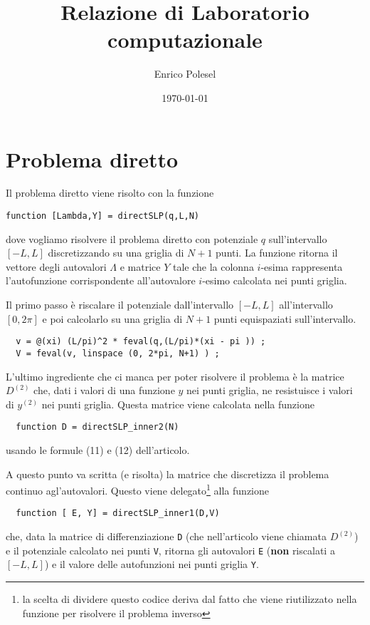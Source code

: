 \documentclass[a4paper,10pt]{article}
\title{Relazione di Laboratorio computazionale}
\author{Enrico Polesel}
\date{\today}
\theoremstyle{plain}
\theoremstyle{definition}
\theoremstyle{remark}
\begin{document}
\maketitle

\lstset{language=Matlab,frame=single}

\section{Problema diretto}

Il problema diretto viene risolto con la funzione
\begin{lstlisting}
function [Lambda,Y] = directSLP(q,L,N)
\end{lstlisting}
dove vogliamo risolvere il problema diretto con potenziale $q$
sull'intervallo $[-L,L]$ discretizzando su una griglia di $N+1$
punti. La funzione ritorna il vettore degli autovalori $\Lambda$ e
matrice $Y$ tale che la colonna $i$-esima rappresenta l'autofunzione
corrispondente all'autovalore $i$-esimo calcolata nei punti griglia. 

Il primo passo è riscalare il potenziale dall'intervallo $[-L,L]$
all'intervallo $[0,2\pi ]$ e poi calcolarlo su una griglia di $N+1$
punti equispaziati sull'intervallo.
\begin{lstlisting}
  v = @(xi) (L/pi)^2 * feval(q,(L/pi)*(xi - pi )) ;
  V = feval(v, linspace (0, 2*pi, N+1) ) ;
\end{lstlisting}

L'ultimo ingrediente che ci manca per poter risolvere il problema è la
matrice $D^{(2)}$ che, dati i valori di una funzione $y$ nei punti
griglia, ne resistuisce i valori di $y^{(2)}$ nei punti
griglia. Questa matrice viene calcolata nella funzione
\begin{lstlisting}
  function D = directSLP_inner2(N)
\end{lstlisting}
usando le formule (11) e (12) dell'articolo.

A questo punto va scritta (e risolta) la matrice che discretizza il
problema continuo agl'autovalori. Questo viene delegato\footnote{la
  scelta di dividere questo codice deriva dal fatto che viene
  riutilizzato nella funzione per risolvere il problema inverso} alla
funzione
\begin{lstlisting}
  function [ E, Y] = directSLP_inner1(D,V)
\end{lstlisting}
che, data la matrice di differenziazione \lstinline{D} (che
nell'articolo viene chiamata $D^{(2)}$) e il potenziale calcolato nei
punti \lstinline{V}, ritorna gli autovalori \lstinline{E} (\textbf{non}
riscalati a $[-L,L]$) e il valore delle autofunzioni nei punti griglia
\lstinline{Y}.
\end{document}

